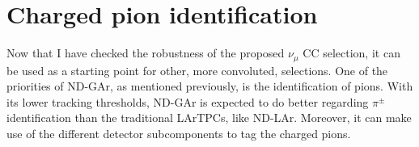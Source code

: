 \section{Charged pion identification}

Now that I have checked the robustness of the proposed $\nu_{\mu}$ CC selection, it can be used as a starting point for other, more convoluted, selections. One of the priorities of ND-GAr, as mentioned previously, is the identification of pions. With its lower tracking thresholds, ND-GAr is expected to do better regarding $\pi^{\pm}$ identification than the traditional LArTPCs, like ND-LAr. Moreover, it can make use of the different detector subcomponents to tag the charged pions.

